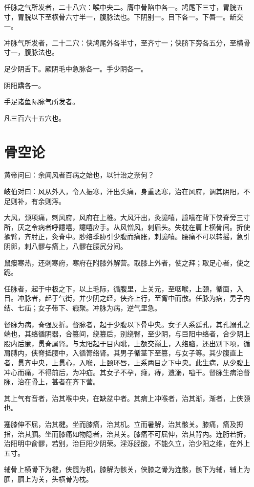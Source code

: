 \documentclass{article}%
\begin{document}
任脉之气所发者，二十八穴：喉中央二。膺中骨陷中各一。鸠尾下三寸，胃脘五寸，胃脘以下至横骨六寸半一，腹脉法也。下阴别一。目下各一。下唇一。龂交一。

冲脉气所发者，二十二穴：侠鸠尾外各半寸，至齐寸一；侠脐下旁各五分，至横骨寸一，腹脉法也。

足少阴舌下。厥阴毛中急脉各一。手少阴各一。

阴阳蹻各一。

手足诸鱼际脉气所发者。

凡三百六十五穴也。
\section{骨空论}
黄帝问曰：余闻风者百病之始也，以针治之奈何？

岐伯对曰：风从外入，令人振寒，汗出头痛，身重恶寒，治在风府，调其阴阳，不足则补，有余则泻。

大风，颈项痛，刺风府，风府在上椎。大风汗出，灸譩嘻，譩嘻在背下侠脊旁三寸所，厌之令病者呼譩嘻，譩嘻应手。从风憎风，刺眉头。失枕在肩上横骨间。折使揄臂，齐肘正，灸脊中。䏚络季胁引少腹而痛胀，刺譩嘻。腰痛不可以转摇，急引阴卵，刺八髎与痛上，八髎在腰尻分间。

鼠瘘寒热，还刺寒府，寒府在附膝外解营。取膝上外者，使之拜；取足心者，使之跪。

任脉者，起于中极之下，以上毛际，循腹里，上关元，至咽喉，上颐，循面，入目。冲脉者，起于气街，并少阴之经，侠齐上行，至胷中而散。任脉为病，男子内结、七疝；女子带下、瘕聚。冲脉为病，逆气里急。

督脉为病，脊强反折。督脉者，起于少腹以下骨中央。女子入系廷孔，其孔溺孔之端也，其络循阴器，合篡间，绕篡后，别绕臀，至少阴，与巨阳中络者，合少阴上股内后廉，贯脊属肾。与太阳起于目内眦，上额交巅上，入络脑，还出别下项，循肩膊内，侠脊抵腰中，入循膂络肾。其男子循茎下至篡，与女子等。其少腹直上者，贯齐中央，上贯心，入喉，上颐环唇，上系两目之下中央。此生病，从少腹上冲心而痛，不得前后，为冲疝。其女子不孕，癃，痔，遗溺，嗌干。督脉生病治督脉，治在骨上，甚者在齐下营。

其上气有音者，治其喉中央，在缺盆中者。其病上冲喉者，治其渐，渐者，上侠颐也。

蹇膝伸不屈，治其楗。坐而膝痛，治其机。立而暑解，治其骸关。膝痛，痛及拇指，治其腘。坐而膝痛如物隐者，治其关。膝痛不可屈伸，治其背内。连胻若折，治阳明中俞髎，若别，治巨阳少阴荣。淫泺胫酸，不能久立，治少阳之维，在外上五寸。

辅骨上横骨下为楗，侠髋为机，膝解为骸关，侠膝之骨为连骸，骸下为辅，辅上为腘，腘上为关，头横骨为枕。
\end{document}
